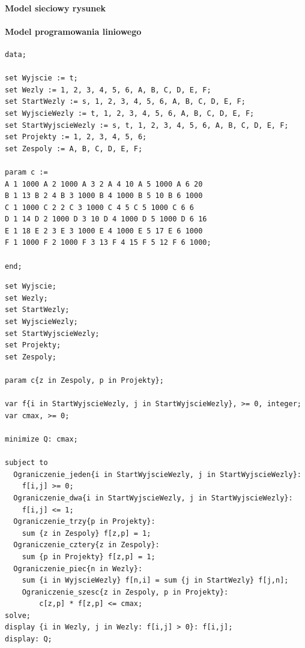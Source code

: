 \paragraph{Model sieciowy rysunek}

\paragraph{Model programowania liniowego}
\begin{lstlisting}[caption= plik dat]
data; 
 
set Wyjscie := t; 
set Wezly := 1, 2, 3, 4, 5, 6, A, B, C, D, E, F; 
set StartWezly := s, 1, 2, 3, 4, 5, 6, A, B, C, D, E, F; 
set WyjscieWezly := t, 1, 2, 3, 4, 5, 6, A, B, C, D, E, F; 
set StartWyjscieWezly := s, t, 1, 2, 3, 4, 5, 6, A, B, C, D, E, F; 
set Projekty := 1, 2, 3, 4, 5, 6; 
set Zespoly := A, B, C, D, E, F; 
 
param c := 
A 1 1000 A 2 1000 A 3 2 A 4 10 A 5 1000 A 6 20
B 1 13 B 2 4 B 3 1000 B 4 1000 B 5 10 B 6 1000 
C 1 1000 C 2 2 C 3 1000 C 4 5 C 5 1000 C 6 6 
D 1 14 D 2 1000 D 3 10 D 4 1000 D 5 1000 D 6 16 
E 1 18 E 2 3 E 3 1000 E 4 1000 E 5 17 E 6 1000 
F 1 1000 F 2 1000 F 3 13 F 4 15 F 5 12 F 6 1000; 
 
end; 
\end{lstlisting}
\begin{lstlisting}[caption= plik mod]
set Wyjscie; 
set Wezly; 
set StartWezly; 
set WyjscieWezly; 
set StartWyjscieWezly; 
set Projekty; 
set Zespoly; 
 
param c{z in Zespoly, p in Projekty}; 
 
var f{i in StartWyjscieWezly, j in StartWyjscieWezly}, >= 0, integer; 
var cmax, >= 0; 
 
minimize Q: cmax; 
 
subject to
  Ograniczenie_jeden{i in StartWyjscieWezly, j in StartWyjscieWezly}: 
    f[i,j] >= 0; 
  Ograniczenie_dwa{i in StartWyjscieWezly, j in StartWyjscieWezly}: 
    f[i,j] <= 1; 
  Ograniczenie_trzy{p in Projekty}: 
    sum {z in Zespoly} f[z,p] = 1; 
  Ograniczenie_cztery{z in Zespoly}: 
    sum {p in Projekty} f[z,p] = 1; 
  Ograniczenie_piec{n in Wezly}: 
    sum {i in WyjscieWezly} f[n,i] = sum {j in StartWezly} f[j,n]; 
	Ograniczenie_szesc{z in Zespoly, p in Projekty}: 
		c[z,p] * f[z,p] <= cmax;
solve;
display {i in Wezly, j in Wezly: f[i,j] > 0}: f[i,j]; 
display: Q;
\end{lstlisting}

